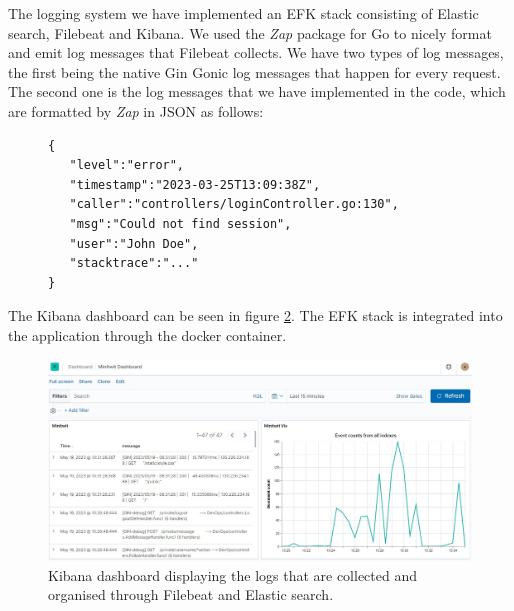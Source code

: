 The logging system we have implemented an EFK stack consisting of Elastic search, Filebeat and Kibana. We used the \textit{Zap} package for Go to nicely format and emit log messages that Filebeat collects. We have two types of log messages, the first being the native Gin Gonic log messages that happen for every request. The second one is the log messages that we have implemented in the code, which are formatted by \textit{Zap} in JSON as follows:

\begin{figure}[H]
    \begin{footnotesize}
        \begin{verbatim}
{
   "level":"error",
   "timestamp":"2023-03-25T13:09:38Z",
   "caller":"controllers/loginController.go:130",
   "msg":"Could not find session",
   "user":"John Doe",
   "stacktrace":"..."
}
        \end{verbatim}
    \end{footnotesize}
    \label{fig:my_label}
\end{figure}

The Kibana dashboard can be seen in figure \ref{fig:kibana_dashboard}. The EFK stack is integrated into the application through the docker container.

\begin{figure}[H]
    \centering
    \includegraphics[width=\textwidth]{images/kibana.jpg}
    \caption{Kibana dashboard displaying the logs that are collected and organised through Filebeat and Elastic search.}
    \label{fig:kibana_dashboard}
\end{figure}

